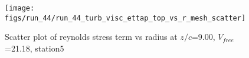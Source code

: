 \begin{figure}[H]
\centering
\texttt{[image: figs/run\_44/run\_44\_turb\_visc\_ettap\_top\_vs\_r\_mesh\_scatter]}
\caption{Scatter plot of reynolds stress term vs radius at $z/c$=9.00, $V_{free}$=21.18, station5}
\label{fig:run_44_turb_visc_ettap_top_vs_r_mesh_scatter}
\end{figure}


